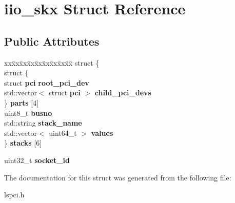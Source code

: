\section{iio\+\_\+skx Struct Reference}
\label{structiio__skx}
\subsection*{Public Attributes}
\begin{DoxyCompactItemize}
\item 
\mbox{\label{structiio__skx_a9f7e3be0f6d7bbcad6ca13d0e04753c8}} 
\begin{tabbing}
xx\=xx\=xx\=xx\=xx\=xx\=xx\=xx\=xx\=\kill
struct \{\\
\>struct \{\\
\>\>struct \textbf{ pci} {\bfseries root\_pci\_dev}\\
\>\>std::vector$<$ struct \textbf{ pci} $>$ {\bfseries child\_pci\_devs}\\
\>\} {\bfseries parts} [4]\\
\>uint8\_t {\bfseries busno}\\
\>std::string {\bfseries stack\_name}\\
\>std::vector$<$ uint64\_t $>$ {\bfseries values}\\
\} {\bfseries stacks} [6]\\

\end{tabbing}\item 
\mbox{\label{structiio__skx_ad384eb7a01209cddfffbdb7424740bd9}} 
uint32\+\_\+t {\bfseries socket\+\_\+id}
\end{DoxyCompactItemize}


The documentation for this struct was generated from the following file\+:\begin{DoxyCompactItemize}
\item 
lspci.\+h\end{DoxyCompactItemize}
